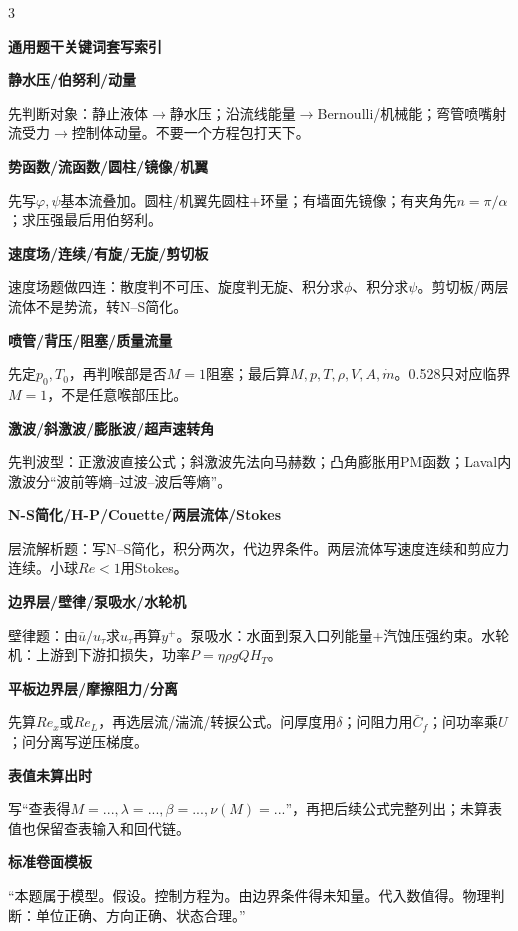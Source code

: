 \documentclass[a4paper]{article}
\newcommand{\qt}[1]{\vspace{0.25pt}\colorbox{Q}{\parbox{\dimexpr\linewidth-2\fboxsep}{\color{white}\bfseries #1}}\par}
\newcommand{\sect}[1]{\qt{#1}}
\begin{document}
\begin{multicols}{3}
{\sect{通用题干关键词套写索引}
\sect{静水压/伯努利/动量}
先判断对象：静止液体$\to$静水压；沿流线能量$\to$Bernoulli/机械能；弯管喷嘴射流受力$\to$控制体动量。不要一个方程包打天下。
\sect{势函数/流函数/圆柱/镜像/机翼}
先写$\varphi,\psi$基本流叠加。圆柱/机翼先圆柱+环量；有墙面先镜像；有夹角先$n=\pi/\alpha$；求压强最后用伯努利。
\sect{速度场/连续/有旋/无旋/剪切板}
速度场题做四连：散度判不可压、旋度判无旋、积分求$\phi$、积分求$\psi$。剪切板/两层流体不是势流，转N--S简化。
\sect{喷管/背压/阻塞/质量流量}
先定$p_0,T_0$，再判喉部是否$M=1$阻塞；最后算$M,p,T,\rho,V,A,\dot m$。0.528只对应临界$M=1$，不是任意喉部压比。
\sect{激波/斜激波/膨胀波/超声速转角}
先判波型：正激波直接公式；斜激波先法向马赫数；凸角膨胀用PM函数；Laval内激波分“波前等熵--过波--波后等熵”。
\sect{N-S简化/H-P/Couette/两层流体/Stokes}
层流解析题：写N--S简化，积分两次，代边界条件。两层流体写速度连续和剪应力连续。小球$Re<1$用Stokes。
\sect{边界层/壁律/泵吸水/水轮机}
壁律题：由$\bar u/u_\tau$求$u_\tau$再算$y^+$。泵吸水：水面到泵入口列能量+汽蚀压强约束。水轮机：上游到下游扣损失，功率$P=\eta\rho gQH_T$。
\sect{平板边界层/摩擦阻力/分离}
先算$Re_x$或$Re_L$，再选层流/湍流/转捩公式。问厚度用$\delta$；问阻力用$\bar C_f$；问功率乘$U$；问分离写逆压梯度。
\sect{表值未算出时}
写“查表得$M=...,\lambda=...,\beta=...,\nu(M)=...$”，再把后续公式完整列出；未算表值也保留查表输入和回代链。
\sect{标准卷面模板}
“本题属于\underline{\hspace{1cm}}模型。假设\underline{\hspace{1cm}}。控制方程为\underline{\hspace{1cm}}。由边界条件\underline{\hspace{1cm}}得未知量。代入数值得\underline{\hspace{1cm}}。物理判断：单位正确、方向正确、状态合理。”

}
\end{multicols}
\end{document}
